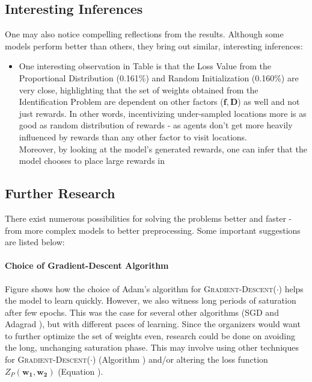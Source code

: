 \documentclass[12pt]{article}
\newcommand{\matr}[1]{\mathbf{#1}}  %
\begin{document}
    \subsection{Interesting Inferences}
    One may also notice compelling reflections from the results. Although some models perform better than others, they bring out similar, interesting inferences:
    \begin{itemize}
        \item One interesting observation in Table  is that the Loss Value from the Proportional Distribution (0.161\%) and Random Initialization (0.160\%) are very close, highlighting that the set of weights obtained from the Identification Problem are dependent on other factors ($\matr{f}, \matr{D}$) as well and not just rewards. In other words, incentivizing under-sampled locations more is as good as random distribution of rewards - as agents don't get more heavily influenced by rewards than any other factor to visit locations.\\
        Moreover, by looking at the model's generated rewards, one can infer that the model chooses to place large rewards in 
    \end{itemize}

    \subsection{Further Research}
    There exist numerous possibilities for solving the problems better and faster - from more complex models to better preprocessing. Some important suggestions are listed below:
    
    \paragraph{Choice of Gradient-Descent Algorithm} Figure  shows how the choice of Adam's algorithm \cite{Adam} for \textsc{Gradient-Descent}($\cdot$) helps the model to learn quickly. However, we also witness long periods of saturation after few epochs. This was the case for several other algorithms (SGD \cite{SGD} and Adagrad \cite{Adagrad}), but with different paces of learning. Since the organizers would want to further optimize the set of weights even, research could be done on avoiding the long, unchanging saturation phase. This may involve using other techniques for \textsc{Gradient-Descent}($\cdot$) (Algorithm ) and/or altering the loss function $Z_P(\matr{w_1}, \matr{w_2})$ (Equation ).
    
\end{document}

